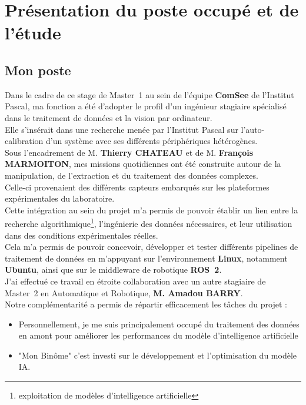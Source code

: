 \documentclass[12pt,a4paper,oneside]{report}
\begin{document}
\chapter{Présentation du poste occupé et de l'étude}

\section{Mon poste}

Dans le cadre de ce stage de Master~1 au sein de l'équipe \textbf{ComSee} de l'Institut Pascal, ma fonction a été d'adopter le profil d'un ingénieur stagiaire spécialisé dans le traitement de données et la vision par ordinateur.\\

\hspace*{.5cm}Elle s'insérait dans une recherche menée par l'Institut Pascal sur l'auto-calibration d'un système avec ses différents périphériques hétérogènes.\\

Sous l'encadrement de M. \textbf{Thierry CHATEAU} et de M. \textbf{François MARMOITON}, mes missions quotidiennes ont été construite autour de la manipulation, de l'extraction et du traitement des données complexes. \\

\hspace*{.5cm}Celle-ci provenaient des différents capteurs embarqués sur les plateformes expérimentales du laboratoire.\\

Cette intégration au sein du projet m'a permis de pouvoir établir un lien entre la recherche algorithmique\footnote{exploitation de modèles d'intelligence artificielle}, l'ingénierie des données nécessaires, et leur utilisation dans des conditions expérimentales réelles.\\
\hspace*{.5cm}Cela m'a permis de pouvoir concevoir, développer et tester différents pipelines de traitement de données en m'appuyant sur l'environnement \textbf{Linux}, notamment \textbf{Ubuntu}, ainsi que sur le middleware de robotique \textbf{ROS~2}.\\

J'ai effectué ce travail en étroite collaboration avec un autre stagiaire de Master~2 en Automatique et Robotique, \textbf{M. Amadou BARRY}. \\
Notre complémentarité a permis de répartir efficacement les tâches du projet : 
\begin{itemize}[label=\textbullet]
    \item Personnellement, je me suis principalement occupé du traitement des données en amont pour améliorer les performances du modèle d'intelligence artificielle\\
    \item "Mon Binôme" c'est investi sur le développement et l'optimisation du modèle IA.
\end{itemize}
\end{document}
